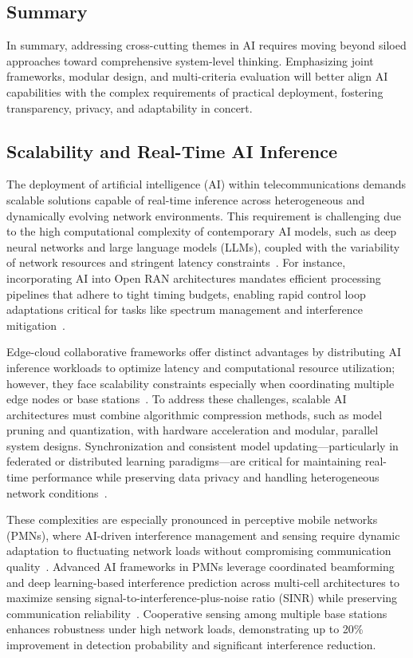 \documentclass[sigconf]{acmart}
\begin{document}
\subsection{Summary}

In summary, addressing cross-cutting themes in AI requires moving beyond siloed approaches toward comprehensive system-level thinking. Emphasizing joint frameworks, modular design, and multi-criteria evaluation will better align AI capabilities with the complex requirements of practical deployment, fostering transparency, privacy, and adaptability in concert.

\subsection{Scalability and Real-Time AI Inference}

The deployment of artificial intelligence (AI) within telecommunications demands scalable solutions capable of real-time inference across heterogeneous and dynamically evolving network environments. This requirement is challenging due to the high computational complexity of contemporary AI models, such as deep neural networks and large language models (LLMs), coupled with the variability of network resources and stringent latency constraints~\cite{ref7,ref49,ref52,ref53}. For instance, incorporating AI into Open RAN architectures mandates efficient processing pipelines that adhere to tight timing budgets, enabling rapid control loop adaptations critical for tasks like spectrum management and interference mitigation~\cite{ref48}.

Edge-cloud collaborative frameworks offer distinct advantages by distributing AI inference workloads to optimize latency and computational resource utilization; however, they face scalability constraints especially when coordinating multiple edge nodes or base stations~\cite{ref49}. To address these challenges, scalable AI architectures must combine algorithmic compression methods, such as model pruning and quantization, with hardware acceleration and modular, parallel system designs. Synchronization and consistent model updating—particularly in federated or distributed learning paradigms—are critical for maintaining real-time performance while preserving data privacy and handling heterogeneous network conditions~\cite{ref52}.

These complexities are especially pronounced in perceptive mobile networks (PMNs), where AI-driven interference management and sensing require dynamic adaptation to fluctuating network loads without compromising communication quality~\cite{ref53}. Advanced AI frameworks in PMNs leverage coordinated beamforming and deep learning-based interference prediction across multi-cell architectures to maximize sensing signal-to-interference-plus-noise ratio (SINR) while preserving communication reliability~\cite{ref48}. Cooperative sensing among multiple base stations enhances robustness under high network loads, demonstrating up to 20\% improvement in detection probability and significant interference reduction.
\end{document}
